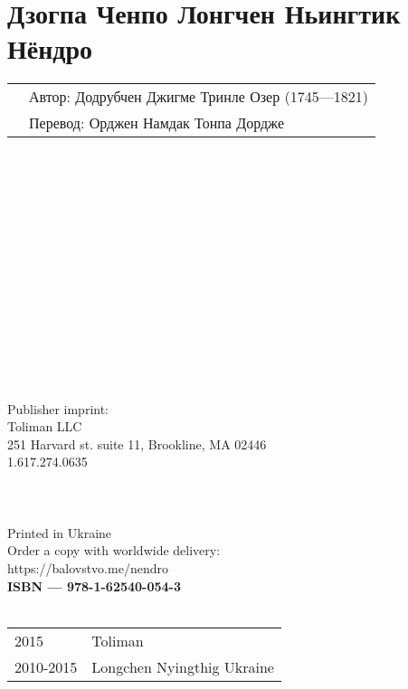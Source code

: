 \section*{Дзогпа Ченпо Лонгчен Ньингтик Нёндро}

\begin{tabular}{ll}
& Автор: Додрубчен Джигме Тринле Озер (1745—1821)\\
& Перевод: Орджен Намдак Тонпа Дордже\\
\end{tabular}
\\
\\
\\
\\
\\
\\
\\
\\
\\
\\
\\
\\
\\
\\
Publisher imprint: \\
Toliman LLC \\
251 Harvard st. suite 11, Brookline, MA 02446 \\
1.617.274.0635 \\
\\
\\
\\
Printed in Ukraine \\

Order a copy with worldwide delivery: \\
https://balovstvo.me/nendro \\

{\bf  ISBN — 978-1-62540-054-3 \hspace{2em}} \\ \\

\begin{tabular}{ll}
\textcopyright{} 2015 & Toliman \\
\textcopyright{} 2010-2015 & Longchen Nyingthig Ukraine
\end{tabular}
